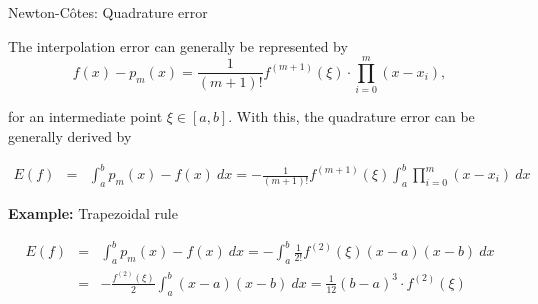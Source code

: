 \begin{vbframe}{Newton-C\^{o}tes: Quadrature error}

The interpolation error can generally be represented by
\vspace*{-0.3cm}
$$
f(x) - p_m(x) = \frac{1}{(m + 1)!} f^{(m + 1)}(\xi) \cdot \prod_{i = 0}^m (x - x_i),
$$

for an intermediate point $\xi \in [a, b]$. With this, the quadrature error can be generally derived by

\vspace*{-0.3cm}
\begin{eqnarray*}
E(f) &=& \int_a^b p_m(x) - f(x) ~dx = - \frac{1}{(m + 1)!} f^{(m + 1)}(\xi) \int_a^b \prod_{i = 0}^m (x - x_i) ~ dx
\end{eqnarray*}

\vspace*{0.3cm}
\textbf{Example:} Trapezoidal rule


\vspace*{-0.3cm}
\begin{eqnarray*}
E(f) &=& \int_a^b p_m(x) - f(x) ~dx = - \int_a^b \frac{1}{2!} f^{(2)}(\xi) (x - a)(x - b) ~dx\\
&=& - \frac{f^{(2)}(\xi)}{2} \int_a^b (x - a)(x - b)~dx = \frac{1}{12} (b - a)^3 \cdot f^{(2)}(\xi)
\end{eqnarray*}

\end{vbframe}


